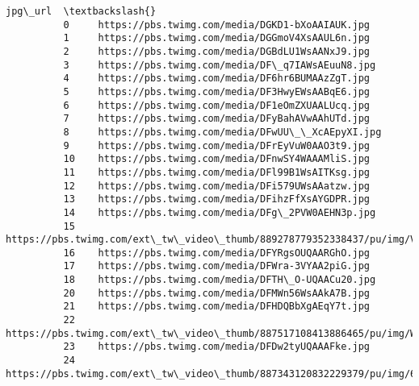 \documentclass[11pt]{article}
\begin{document}
\begin{Verbatim}[commandchars=\\\{\}]
                                                                                                jpg\_url  \textbackslash{}
          0     https://pbs.twimg.com/media/DGKD1-bXoAAIAUK.jpg                                           
          1     https://pbs.twimg.com/media/DGGmoV4XsAAUL6n.jpg                                           
          2     https://pbs.twimg.com/media/DGBdLU1WsAANxJ9.jpg                                           
          3     https://pbs.twimg.com/media/DF\_q7IAWsAEuuN8.jpg                                           
          4     https://pbs.twimg.com/media/DF6hr6BUMAAzZgT.jpg                                           
          5     https://pbs.twimg.com/media/DF3HwyEWsAABqE6.jpg                                           
          6     https://pbs.twimg.com/media/DF1eOmZXUAALUcq.jpg                                           
          7     https://pbs.twimg.com/media/DFyBahAVwAAhUTd.jpg                                           
          8     https://pbs.twimg.com/media/DFwUU\_\_XcAEpyXI.jpg                                           
          9     https://pbs.twimg.com/media/DFrEyVuW0AAO3t9.jpg                                           
          10    https://pbs.twimg.com/media/DFnwSY4WAAAMliS.jpg                                           
          11    https://pbs.twimg.com/media/DFl99B1WsAITKsg.jpg                                           
          12    https://pbs.twimg.com/media/DFi579UWsAAatzw.jpg                                           
          13    https://pbs.twimg.com/media/DFihzFfXsAYGDPR.jpg                                           
          14    https://pbs.twimg.com/media/DFg\_2PVW0AEHN3p.jpg                                           
          15    https://pbs.twimg.com/ext\_tw\_video\_thumb/889278779352338437/pu/img/VlbFB3v8H8VwzVNY.jpg   
          16    https://pbs.twimg.com/media/DFYRgsOUQAARGhO.jpg                                           
          17    https://pbs.twimg.com/media/DFWra-3VYAA2piG.jpg                                           
          18    https://pbs.twimg.com/media/DFTH\_O-UQAACu20.jpg                                           
          20    https://pbs.twimg.com/media/DFMWn56WsAAkA7B.jpg                                           
          21    https://pbs.twimg.com/media/DFHDQBbXgAEqY7t.jpg                                           
          22    https://pbs.twimg.com/ext\_tw\_video\_thumb/887517108413886465/pu/img/WanJKwssZj4VJvL9.jpg   
          23    https://pbs.twimg.com/media/DFDw2tyUQAAAFke.jpg                                           
          24    https://pbs.twimg.com/ext\_tw\_video\_thumb/887343120832229379/pu/img/6HSuFrW1lzI\_9Mht.jpg   

\end{Verbatim}
\end{document}
